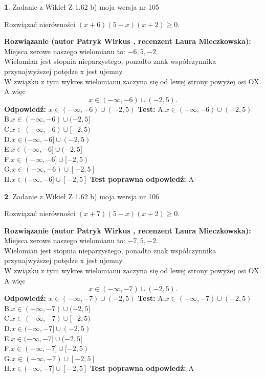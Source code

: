\documentclass[12pt, a4paper]{article}
\theoremstyle{definition} %
\newtheorem{zad}{}
\newcommand{\zadStart}[1]{\begin{zad}#1\newline}
\newcommand{\zadStop}{\end{zad}}
\newcommand{\rozwStart}[2]{\noindent \textbf{Rozwiązanie (autor #1 , recenzent #2): }\newline}
\newcommand{\rozwStop}{\newline}
\newcommand{\odpStart}{\noindent \textbf{Odpowiedź:}\newline}
\newcommand{\odpStop}{\newline}
\newcommand{\testStart}{\noindent \textbf{Test:}\newline}
\newcommand{\testStop}{\newline}
\newcommand{\kluczStart}{\noindent \textbf{Test poprawna odpowiedź:}\newline}
\newcommand{\kluczStop}{\newline}
\begin{document}
\zadStart{Zadanie z Wikieł Z 1.62 b) moja wersja nr 105}

Rozwiązać nierówności $(x+6)(5-x)(x+2)\ge0$.
\zadStop
\rozwStart{Patryk Wirkus}{Laura Mieczkowska}
Miejsca zerowe naszego wielomianu to: $-6, 5, -2$.\\
Wielomian jest stopnia nieparzystego, ponadto znak współczynnika przy\linebreak najwyższej potędze x jest ujemny.\\ W związku z tym wykres wielomianu zaczyna się od lewej strony powyżej osi OX. A więc $$x \in (-\infty,-6) \cup (-2,5).$$
\rozwStop
\odpStart
$x \in (-\infty,-6) \cup (-2,5)$
\odpStop
\testStart
A.$x \in (-\infty,-6) \cup (-2,5)$\\
B.$x \in (-\infty,-6) \cup (-2,5]$\\
C.$x \in (-\infty,-6) \cup [-2,5)$\\
D.$x \in (-\infty,-6] \cup (-2,5)$\\
E.$x \in (-\infty,-6] \cup (-2,5]$\\
F.$x \in (-\infty,-6] \cup [-2,5)$\\
G.$x \in (-\infty,-6) \cup [-2,5]$\\
H.$x \in (-\infty,-6] \cup [-2,5]$
\testStop
\kluczStart
A
\kluczStop



\zadStart{Zadanie z Wikieł Z 1.62 b) moja wersja nr 106}

Rozwiązać nierówności $(x+7)(5-x)(x+2)\ge0$.
\zadStop
\rozwStart{Patryk Wirkus}{Laura Mieczkowska}
Miejsca zerowe naszego wielomianu to: $-7, 5, -2$.\\
Wielomian jest stopnia nieparzystego, ponadto znak współczynnika przy\linebreak najwyższej potędze x jest ujemny.\\ W związku z tym wykres wielomianu zaczyna się od lewej strony powyżej osi OX. A więc $$x \in (-\infty,-7) \cup (-2,5).$$
\rozwStop
\odpStart
$x \in (-\infty,-7) \cup (-2,5)$
\odpStop
\testStart
A.$x \in (-\infty,-7) \cup (-2,5)$\\
B.$x \in (-\infty,-7) \cup (-2,5]$\\
C.$x \in (-\infty,-7) \cup [-2,5)$\\
D.$x \in (-\infty,-7] \cup (-2,5)$\\
E.$x \in (-\infty,-7] \cup (-2,5]$\\
F.$x \in (-\infty,-7] \cup [-2,5)$\\
G.$x \in (-\infty,-7) \cup [-2,5]$\\
H.$x \in (-\infty,-7] \cup [-2,5]$
\testStop
\kluczStart
A
\kluczStop
\end{document}
